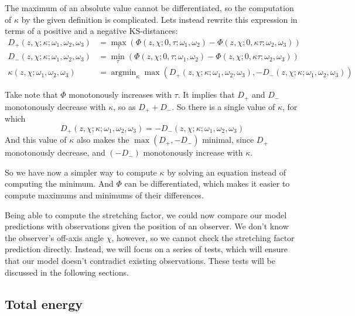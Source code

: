 \documentclass{article}
\DeclareMathOperator*{\argmin}{argmin}
\begin{document}
The maximum of an absolute value cannot be differentiated, so the computation of $\kappa$ by the given definition is complicated. Lets instead rewrite this expression in terms of a positive and a negative KS-distances:
\begin{align*}
D_+\left(z,\chi; \kappa; \omega_1, \omega_2, \omega_3\right) &= \max_\tau\left( \Phi\left(z,\chi; 0,\tau; \omega_1,\omega_2\right) - \Phi\left( z,\chi; 0,\kappa \tau; \omega_2,\omega_3 \right) \right) \\
D_-\left(z,\chi; \kappa; \omega_1, \omega_2, \omega_3\right) &= \min_\tau\left( \Phi\left(z,\chi; 0,\tau; \omega_1,\omega_2\right) - \Phi\left( z,\chi; 0,\kappa \tau; \omega_2,\omega_3 \right) \right) \\
\kappa\left(z,\chi; \omega_1, \omega_2, \omega_3\right) &= \argmin_\kappa \max\left(D_+\left(z,\chi; \kappa; \omega_1, \omega_2, \omega_3\right), -D_-\left(z,\chi; \kappa; \omega_1, \omega_2, \omega_3\right)\right)
\end{align*}

Take note that $\Phi$ monotonously increases with $\tau$. It implies that $D_+$ and $D_-$ monotonously decrease with $\kappa$, so as $D_+ + D_-$. So there is a single value of $\kappa$, for which
\begin{equation}
D_+\left(z,\chi; \kappa; \omega_1, \omega_2, \omega_3\right) = -D_-\left(z,\chi; \kappa; \omega_1, \omega_2, \omega_3\right)
\end{equation}
And this value of $\kappa$ also makes the $\max\left({D_+, -D_-}\right)$ minimal, since $D_+$ monotonously decrease, and $\left(-D_-\right)$ monotonously increase with $\kappa$.

So we have now a simpler way to compute $\kappa$ by solving an equation instead of computing the minimum. And $\Phi$ can be differentiated, which makes it easier to compute maximums and minimums of their differences.

Being able to compute the stretching factor, we could now compare our model predictions with observations given the position of an observer. We don't know the observer's off-axis angle $\chi$, however, so we cannot check the stretching factor prediction directly. Instead, we will focus on a series of tests, which will ensure that our model doesn't contradict existing observations. These tests will be discussed in the following sections.

\subsection{Total energy}
\end{document}
